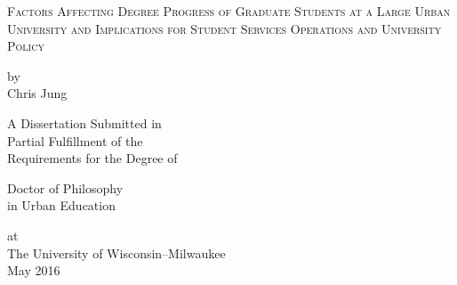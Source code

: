 \documentclass[12pt]{book}
\begin{document}
\frontmatter
{\centering\LARGE \textsc{Factors Affecting Degree Progress of Graduate Students at a Large Urban University and Implications for Student Services Operations and University Policy} \par}

\phantom{}\par\phantom{}

{\centering\large by\\Chris Jung \par}

\phantom{}\par\phantom{}

{\centering\large A Dissertation Submitted in\\Partial Fulfillment of the\\Requirements for the Degree of \par}

\phantom{}\par\phantom{}

{\centering\large Doctor of Philosophy\\in Urban Education \par}

\phantom{}\par\phantom{}

{\centering\large at\\The University of Wisconsin--Milwaukee\\May 2016 \par}
\pagestyle{plain}\setcounter{page}{0}\clearpage\phantom{}\setcounter{page}{0}\clearpage
\end{document}

